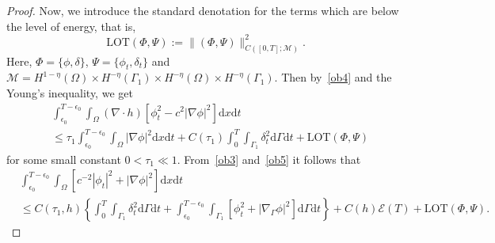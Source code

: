 \documentclass[10pt]{elsarticle}
\begin{document}
\begin{proof}
Now, we introduce the standard denotation for the terms which are below the level of energy, that is,
\[
	\textrm{LOT}(\Phi, \Psi):=\|(\Phi, \Psi)\|^2_{C([0, T]; \mathcal{M})}.
\]
Here, $\Phi=\{\phi, \delta\}$, $\Psi=\{\phi_t, \delta_t\}$ and $\mathcal{M}=H^{1-\eta}(\Omega)\times H^{-\eta}(\Gamma_1)\times H^{-\eta}(\Omega)\times H^{-\eta}(\Gamma_1)$. Then by~\eqref{ob4} and the Young's inequality, we get
\begin{equation} \label{ob5}
\begin{split} 
	&\int_{\epsilon_0}^{T-\epsilon_0}\int_{\Omega}(\nabla\cdot h)[\phi_t^2-c^2 |\nabla\phi|^2]\mathrm{d}x \mathrm{d}t\\
	& \leq \tau_1\int_{\epsilon_0}^{T-\epsilon_0}\int_{\Omega}|\nabla\phi|^2 \mathrm{d}x \mathrm{d}t+C(\tau_1) \int_{0}^{T}\int_{\Gamma_1}\delta_t^2\mathrm{d}\Gamma \mathrm{d}t +\textrm{LOT}(\Phi, \Psi)
\end{split}
\end{equation}
for some small constant $0<\tau_1\ll1$.
From~\eqref{ob3} and~\eqref{ob5} it follows that
\begin{equation} 
\begin{split}\label{ob6}
	&\int_{\epsilon_0}^{T-\epsilon_0}\int_{\Omega}[c^{-2}|\phi_t|^2+ |\nabla\phi|^2]\mathrm{d}x \mathrm{d}t \\
	&\leq C(\tau_1, h) \left\{\int_{0}^{T}\int_{\Gamma_1}\delta_t^2\mathrm{d}\Gamma \mathrm{d}t + \int_{\epsilon_0}^{T-\epsilon_0}\int_{\Gamma_1}[\phi_t^2 + |\nabla_{\Gamma}\phi|^2]\mathrm{d}\Gamma \mathrm{d}t \right\} +C(h)\mathcal{E}(T)+\textrm{LOT}(\Phi, \Psi).
\end{split}
\end{equation}


\end{proof}
\end{document}
